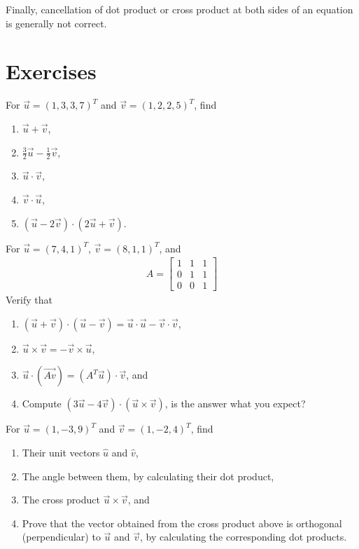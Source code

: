 Finally, cancellation of dot product or cross product at both sides of an equation is generally not correct.

\section{Exercises}

\begin{Exercise}
For $\vec{u} = (1, 3, 3, 7)^T$ and $\vec{v} = (1, 2, 2, 5)^T$, find
\begin{enumerate}[label=(\alph*)]
\item $\vec{u} + \vec{v}$,
\item $\frac{3}{2}\vec{u} - \frac{1}{2}\vec{v}$,
\item $\vec{u} \cdot \vec{v}$,
\item $\vec{v} \cdot \vec{u}$,
\item $(\vec{u} - 2\vec{v}) \cdot (2\vec{u} + \vec{v})$.
\end{enumerate}
\end{Exercise}

\begin{Exercise}
For $\vec{u} = (7, 4, 1)^T$, $\vec{v} = (8, 1, 1)^T$, and
\begin{align*}
A = 
\begin{bmatrix}
1 & 1 & 1\\
0 & 1 & 1\\
0 & 0 & 1
\end{bmatrix}
\end{align*}
Verify that
\begin{enumerate}[label=(\alph*)]
\item $(\vec{u} + \vec{v}) \cdot (\vec{u} - \vec{v}) = \vec{u} \cdot \vec{u} - \vec{v} \cdot \vec{v}$,
\item $\vec{u} \times \vec{v} = -\vec{v} \times \vec{u}$, 
\item $\vec{u} \cdot (\vec{Av}) = (A^T\vec{u}) \cdot \vec{v}$, and
\item Compute $(3\vec{u} - 4\vec{v}) \cdot (\vec{u} \times \vec{v})$, is the answer what you expect?
\end{enumerate}
\end{Exercise}

\begin{Exercise}
For $\vec{u} = (1, -3, 9)^T$ and $\vec{v} = (1, -2, 4)^T$, find
\begin{enumerate}[label=(\alph*)]
\item Their unit vectors $\hat{u}$ and $\hat{v}$,
\item The angle between them, by calculating their dot product,
\item The cross product $\vec{u} \times \vec{v}$, and 
\item Prove that the vector obtained from the cross product above is orthogonal (perpendicular) to $\vec{u}$ and $\vec{v}$, by calculating the corresponding dot products.
\end{enumerate}
\end{Exercise}

